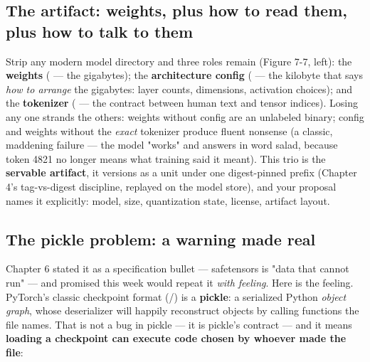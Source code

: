 \subsection*{The artifact: weights, plus how to read them, plus how to talk to them}

Strip any modern model directory and three roles remain (Figure 7-7, left): the \textbf{weights} ( — the gigabytes); the \textbf{architecture config} ( — the kilobyte that says \textit{how to arrange} the gigabytes: layer counts, dimensions, activation choices); and the \textbf{tokenizer} ( — the contract between human text and tensor indices). Losing any one strands the others: weights without config are an unlabeled binary; config and weights without the \textit{exact} tokenizer produce fluent nonsense (a classic, maddening failure — the model "works" and answers in word salad, because token 4821 no longer means what training said it meant). This trio is the \textbf{servable artifact}, it versions as a unit under one digest-pinned prefix (Chapter 4's tag-vs-digest discipline, replayed on the model store), and your proposal names it explicitly: model, size, quantization state, license, artifact layout.

\subsection*{The pickle problem: a warning made real}

Chapter 6 stated it as a specification bullet — safetensors is "data that cannot run" — and promised this week would repeat it \textit{with feeling}. Here is the feeling. PyTorch's classic checkpoint format (/) is a \textbf{pickle}: a serialized Python \textit{object graph}, whose deserializer will happily reconstruct objects by calling functions the file names. That is not a bug in pickle — it is pickle's contract — and it means \textbf{loading a checkpoint can execute code chosen by whoever made the file}:

